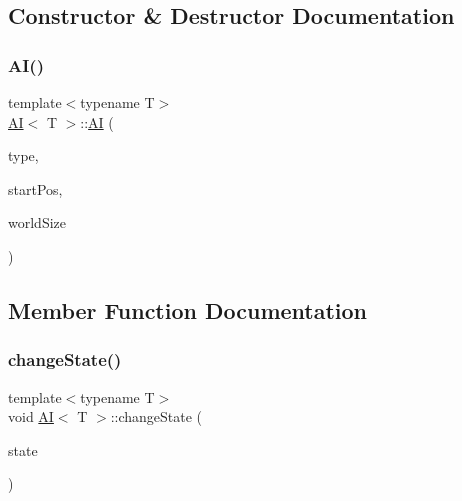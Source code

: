 \subsection{Constructor \& Destructor Documentation}
\mbox{\label{class_a_i_a0e9856d1f5aa1f0009f9ff2cd51e0598}} 
\subsubsection{\texorpdfstring{A\+I()}{AI()}}
{\footnotesize\ttfamily template$<$typename T$>$ \\
\hyperlink{class_a_i}{AI}$<$ T $>$\+::\hyperlink{class_a_i}{AI} (\begin{DoxyParamCaption}\item[{\hyperlink{class_game_object_a4bf9e8f660e6a49f1b802c2aa9dd95af}{Game\+Object\+::\+Type}}]{type,  }\item[{const sf\+::\+Vector2f \&}]{start\+Pos,  }\item[{const sf\+::\+Vector2f \&}]{world\+Size }\end{DoxyParamCaption})\hspace{0.3cm}{\ttfamily [inline]}}



\subsection{Member Function Documentation}
\mbox{\label{class_a_i_ae08cb2117d4352ad462fefa357028a82}} 
\subsubsection{\texorpdfstring{change\+State()}{changeState()}}
{\footnotesize\ttfamily template$<$typename T$>$ \\
void \hyperlink{class_a_i}{AI}$<$ T $>$\+::change\+State (\begin{DoxyParamCaption}\item[{std\+::shared\+\_\+ptr$<$ \hyperlink{class_state}{State}$<$ T $>$$>$}]{state }\end{DoxyParamCaption})\hspace{0.3cm}{\ttfamily [inline]}}

